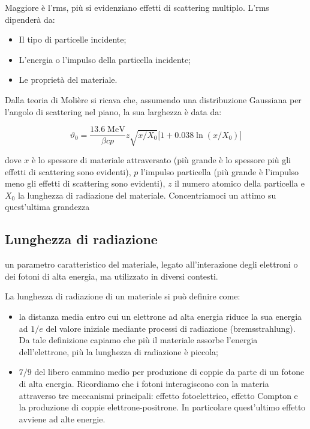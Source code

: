 Maggiore è l'rms, più si evidenziano effetti di scattering multiplo. L'rms dipenderà da:

\begin{itemize}
    \item Il tipo di particelle incidente;
    \item L'energia o l'impulso della particella incidente;
    \item Le proprietà del materiale.
\end{itemize}

Dalla teoria di Molière si ricava che, assumendo una distribuzione Gaussiana per l'angolo di scattering nel piano, la sua larghezza è data da:

$$\vartheta_0=\frac{13.6 \; \text{MeV}}{\beta c p} z \sqrt{x/X_0} \big[ 1 + 0.038 \ln(x/X_0) \big]$$

dove $x$ è lo spessore di materiale attraversato (più grande è lo spessore più gli effetti di scattering sono evidenti), $p$ l'impulso particella (più grande è l'impulso meno gli effetti di scattering sono evidenti), $z$ il numero atomico della particella e $X_0$ la lunghezza di radiazione del materiale. Concentriamoci un attimo su quest'ultima grandezza

\subsection{Lunghezza di radiazione}\label{par:lunghezza_di_radiazione}

\E un parametro caratteristico del materiale, legato all'interazione degli elettroni o dei fotoni di alta energia, ma utilizzato in diversi contesti.

La lunghezza di radiazione di un materiale si può definire come:

\begin{itemize}
    \item la distanza media entro cui un elettrone ad alta energia riduce la sua energia ad $1/e$ del valore iniziale mediante processi di radiazione (bremsstrahlung). Da tale definizione capiamo che più il materiale assorbe l'energia dell'elettrone, più la lunghezza di radiazione è piccola;
    \item $7/9$ del libero cammino medio per produzione di coppie da parte di un fotone di alta energia. Ricordiamo che i fotoni interagiscono con la materia attraverso tre meccanismi principali: effetto fotoelettrico, effetto Compton e la produzione di coppie elettrone-positrone. In particolare quest'ultimo effetto avviene ad alte energie.
\end{itemize}

